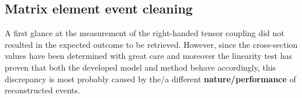 %

\subsection{Matrix element event cleaning} \label{subsec::EvtCleaning}

A first glance at the measurement of the right-handed tensor coupling did not resulted in the expected outcome to be retrieved.
However, since the cross-section values have been determined with great care and moreover the linearity test has proven that both the developed model and method behave accordingly, this discrepancy is most probably caused by the/a different \textbf{nature/performance} of reconstructed events.
\\

